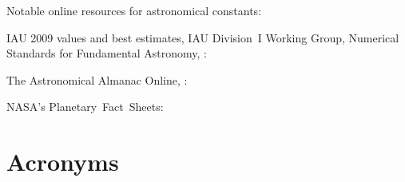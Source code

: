 \bigskip

\noindent Notable online resources for astronomical constants:
\begin{itemize*}
	\item IAU 2009 values and best estimates, IAU Division~I Working Group, Numerical Standards for Fundamental Astronomy, \citet{Luzum2011}:\\
	
	\item The Astronomical Almanac Online, \citet{USNAO2017}:\\
	
	\item NASA's Planetary~Fact~Sheets:\\
	
\end{itemize*}


\newpage

\section{Acronyms}
\label{sec:list_of_acronyms}

